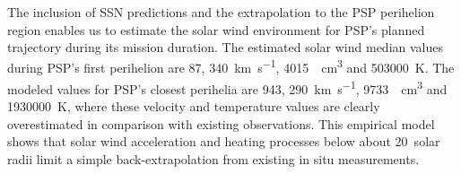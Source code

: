 {The inclusion of SSN predictions and the extrapolation to the PSP perihelion region enables us to estimate the solar wind environment for PSP's planned trajectory during its mission duration. The estimated solar wind median values during PSP's first perihelion are \SI{87}{\nT}, \SI{340}{\km\per\s}, \SI{4015}{\per\cm\cubed} and \SI{503000}{\K}. The modeled values for PSP’s closest perihelia are \SI{943}{\nT}, \SI{290}{\km\per\s}, \SI{9733}{\per\cm\cubed} and \SI{1930000}{\K}, where these velocity and temperature values are clearly overestimated in comparison with existing observations. This empirical model shows that solar wind acceleration and heating processes below about 20~solar radii limit a simple back-extrapolation from existing in situ measurements.}	%
{}	%


\maketitle




